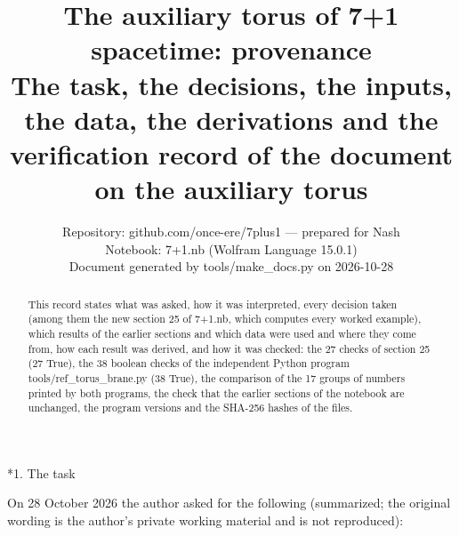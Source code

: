 \documentclass[10pt,a4paper]{article}
\makeatletter
\renewcommand\section{\@startsection{section}{1}{\z@}{-3.5ex \@plus -1ex \@minus -.2ex}{2.3ex \@plus.2ex}{\normalfont\Large\bfseries\raggedright}}
\makeatother
\begin{document}
\title{The auxiliary torus of 7+1 spacetime: provenance\\[0.4em]\large The task, the decisions, the inputs, the data, the derivations and the verification record of the document on the auxiliary torus}
\author{Repository: github.com/once-ere/7plus1 — prepared for Nash\\ Notebook: 7+1.nb (Wolfram Language 15.0.1)\\ Document generated by tools/make\_docs.py on 2026-10-28}
\date{}
\maketitle
\begin{abstract}
This record states what was asked, how it was interpreted, every decision taken (among them the new section 25 of 7+1.nb, which computes every worked example), which results of the earlier sections and which data were used and where they come from, how each result was derived, and how it was checked: the 27 checks of section 25 (27 True), the 38 boolean checks of the independent Python program tools/ref\_torus\_brane.py (38 True), the comparison of the 17 groups of numbers printed by both programs, the check that the earlier sections of the notebook are unchanged, the program versions and the SHA-256 hashes of the files.
\end{abstract}
\tableofcontents
{}\section*{1. The task}
On 28 October 2026 the author asked for the following (summarized; the original wording is the author’s private working material and is not reproduced):
\end{document}
